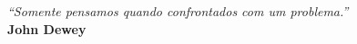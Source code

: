 \begin{epigrafe}
    \vspace*{\fill}
	
		\begin{flushright}
		\textit{“Somente pensamos quando confrontados com um problema.”} \\
		\textbf{John Dewey}
		\end{flushright}
	
	
\end{epigrafe}
